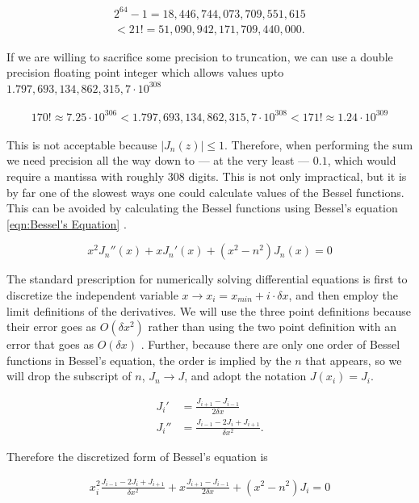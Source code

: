 \documentclass[onecolumn, groupedaddress, 10pt]{revtex4-1}
\begin{document}
\begin{align}
2^{64}-1 = 18,446,744,073,709,551,615 \\
< 21! = 51,090,942,171,709,440,000.
\end{align}

If we are willing to sacrifice some precision to truncation, we can use a double precision floating point integer which allows values upto $1.797,693,134,862,315,7 \cdot 10^{308}$

\begin{align}
170! \approx 7.25 \cdot 10^{306}
< 1.797,693,134,862,315,7 \cdot 10^{308} <
171! \approx 1.24 \cdot 10^{309}
\end{align}

This is not acceptable because $\left| J_n(z) \right| \leq 1$. Therefore, when performing the sum we need precision all the way down to --- at the very least --- $0.1$, which would require a mantissa with roughly $308$ digits.  This is not only impractical, but it is by far one of the slowest ways one could calculate values of the Bessel functions. This can be avoided by calculating the Bessel functions using Bessel's equation \ref{eqn:Bessel's Equation} \citep{folland}.

\begin{equation}
\label{eqn:Bessel's Equation}
x^2 J_n''(x) + x J_n'(x) + (x^2 - n^2) J_n(x) = 0
\end{equation}

The standard prescription for numerically solving differential equations is first to discretize the independent variable $x \to x_i = x_{min} + i \cdot \delta x$, and then employ the limit definitions of the derivatives. We will use the three point definitions because their error goes as $O(\delta x^2)$ rather than using the two point definition with an error that goes as $O(\delta x)$ \cite{morten}.  Further, because there are only one order of Bessel functions in Bessel's equation, the order is implied by the $n$ that appears, so we will drop the subscript of $n$, $J_n \to J$, and adopt the notation $J(x_i) = J_i$.

\begin{align}
J_i'  &= \frac{J_{i+1} - J_{i-1}}{2 \delta x} \\
J_i'' &= \frac{J_{i-1} - 2J_{i} + J_{i+1}}{\delta x^2}.
\end{align}

Therefore the discretized form of Bessel's equation is

\begin{align}
\label{eqn:Bessel's Equation Discretized}
x_i^2 \frac{J_{i-1} - 2J_{i} + J_{i+1}}{\delta x^2} + x \frac{J_{i+1} - J_{i-1}}{2 \delta x} + (x^2 - n^2) J_i = 0
\end{align}
\end{document}
